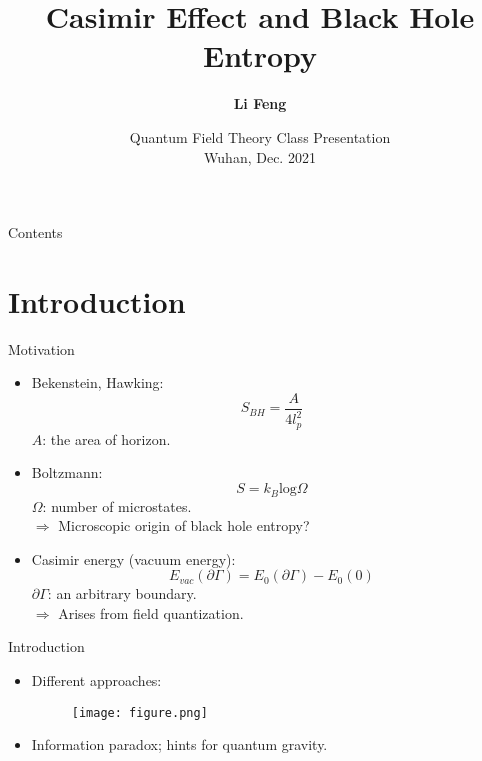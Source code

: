 \documentclass{beamer}
\title{Casimir Effect and Black Hole Entropy}
\author{\textbf{Li Feng}}
\institute{\normalsize School of Physics and Technology, Wuhan University}
\date{Quantum Field Theory Class Presentation\\Wuhan, Dec. 2021}
\begin{document}
\frame{\titlepage}

\begin{frame}{Contents}
    \tableofcontents
\end{frame}

\section{Introduction}
\begin{frame}{Motivation}
    \begin{itemize}
        \item Bekenstein, Hawking:
        \begin{equation*}
            S_{BH}=\frac{A}{4l_p^2}
        \end{equation*}
        $A$: the area of horizon.
        \item Boltzmann:
        \begin{equation*}
            S=k_B\mathrm{log}\Omega
        \end{equation*}
        $\Omega$: number of microstates.\\
        $\Rightarrow$ Microscopic origin of black hole entropy?
        \item Casimir energy (vacuum energy):
        \begin{equation*}
            E_{vac}(\partial \Gamma)=E_0(\partial\Gamma)-E_0(0)
        \end{equation*}
        $\partial \Gamma$: an arbitrary boundary.\\
        $\Rightarrow$ Arises from field quantization.
    \end{itemize}
\end{frame}
\begin{frame}{Introduction}
\begin{itemize}
    \item Different approaches:
    \begin{figure}
        \centering
        \texttt{[image: figure.png]}
        \label{approach}
    \end{figure}
        \item Information paradox; hints for quantum gravity.
    \end{itemize}
\end{frame}
\end{document}
